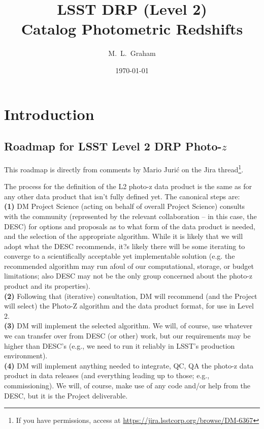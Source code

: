 \documentclass[DM,lsstdraft,toc]{lsstdoc}
\title[LSST Photo-$z$]{LSST DRP (Level 2) \\ Catalog Photometric Redshifts}
\author{M.~L.~Graham}
\date{\today}
\begin{document}
\maketitle




\section{Introduction} \label{sec:intro}

\subsection{Roadmap for LSST Level 2 DRP Photo-$z$}\label{ssec:intro_roadmap}

This roadmap is directly from comments by Mario Juri\'{c} on the Jira thread\footnote{If you have permissions, access at \url{https://jira.lsstcorp.org/browse/DM-6367}}. 

The process for the definition of the L2 photo-z data product is the same as for any other data product that isn't fully defined yet. The canonical steps are: \\ {\bf (1)} DM Project Science (acting on behalf of overall Project Science) consults with the community (represented by the relevant collaboration -- in this case, the DESC) for options and proposals as to what form of the data product is needed, and the selection of the appropriate algorithm. While it is likely that we will adopt what the DESC recommends, it?s likely there will be some iterating to converge to a scientifically acceptable yet implementable solution (e.g. the recommended algorithm may run afoul of our computational, storage, or budget limitations; also DESC may not be the only group concerned about the photo-z product and its properties). \\ {\bf (2)} Following that (iterative) consultation, DM will recommend (and the Project will select) the Photo-Z algorithm and the data product format, for use in Level 2. \\ {\bf (3)} DM will implement the selected algorithm. We will, of course, use whatever we can transfer over from DESC (or other) work, but our requirements may be higher than DESC's (e.g., we need to run it reliably in LSST's production environment). \\ {\bf (4)} DM will implement anything needed to integrate, QC, QA the photo-z data product in data releases (and everything leading up to those; e.g., commissioning). We will, of course, make use of any code and/or help from the DESC, but it is the Project deliverable.
\end{document}
